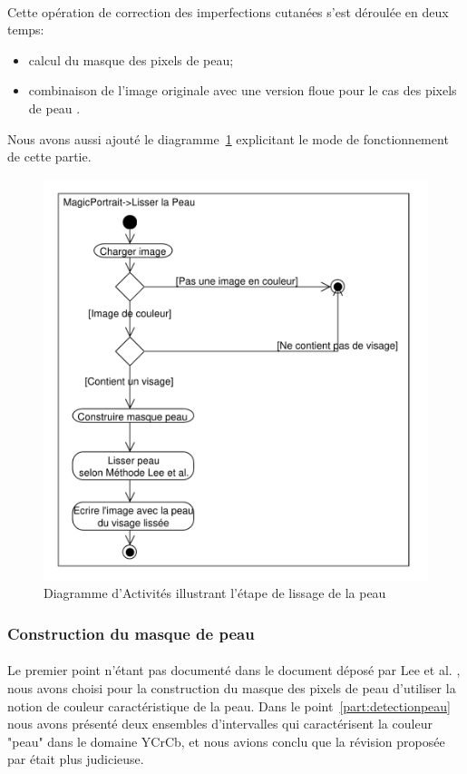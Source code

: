\documentclass[11pt, french]{report-rd-info}
\begin{document}
\paragraph*{}
Cette opération de correction des imperfections cutanées s'est déroulée en deux temps:
\begin{itemize}
\item calcul du masque des pixels de peau;
\item combinaison de l'image originale avec une version floue pour le cas des pixels de peau \cite{Lee}.
\end{itemize}
Nous avons aussi ajouté le diagramme~\ref{diag:diagramme10} explicitant le mode de fonctionnement de cette partie.
\begin{figure}
\centering
\includegraphics[scale=0.5]{Diagrammes/DiagrammeActivites_10_LissagePeau}
\caption{Diagramme d'Activités illustrant l'étape de lissage de la peau}
\label{diag:diagramme10}
\end{figure}

\subsubsection{Construction du masque de peau}
\paragraph*{}
Le premier point n'étant pas documenté dans le document déposé par Lee et al. \cite{Lee}, nous avons choisi pour la construction du masque des pixels de peau d'utiliser la notion de couleur caractéristique de la peau. Dans le point~\ref{part:detectionpeau} nous avons présenté deux ensembles d'intervalles qui caractérisent la couleur "peau" dans le domaine YCrCb, et nous avions conclu que la révision proposée par \cite{Kukharev2004} était plus judicieuse.
\end{document}
